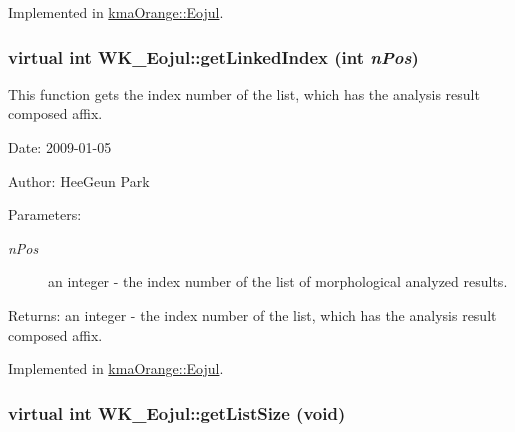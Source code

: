 Implemented in \hyperlink{classkmaOrange_1_1Eojul_7d21a51dc637dcd68d2bfa3ae01cb656}{kmaOrange::Eojul}.\hypertarget{classWK__Eojul_45b0ae73689aca02fb735332ba63150d}{
\subsubsection[{getLinkedIndex}]{\setlength{\rightskip}{0pt plus 5cm}virtual int WK\_\-Eojul::getLinkedIndex (int {\em nPos})}}
\label{classWK__Eojul_45b0ae73689aca02fb735332ba63150d}


This function gets the index number of the list, which has the analysis result composed affix. 

\begin{Desc}
\item[Date:]2009-01-05 \end{Desc}
\begin{Desc}
\item[Author:]HeeGeun Park \end{Desc}
\begin{Desc}
\item[Parameters:]
\begin{description}
\item[{\em nPos}]an integer - the index number of the list of morphological analyzed results. \end{description}
\end{Desc}
\begin{Desc}
\item[Returns:]an integer - the index number of the list, which has the analysis result composed affix. \end{Desc}


Implemented in \hyperlink{classkmaOrange_1_1Eojul_c90fa4bf9cfd402caf1aaeee1166d7d1}{kmaOrange::Eojul}.\hypertarget{classWK__Eojul_3c0cccef5359472075e758274f716720}{
\subsubsection[{getListSize}]{\setlength{\rightskip}{0pt plus 5cm}virtual int WK\_\-Eojul::getListSize (void)}}
\label{classWK__Eojul_3c0cccef5359472075e758274f716720}


